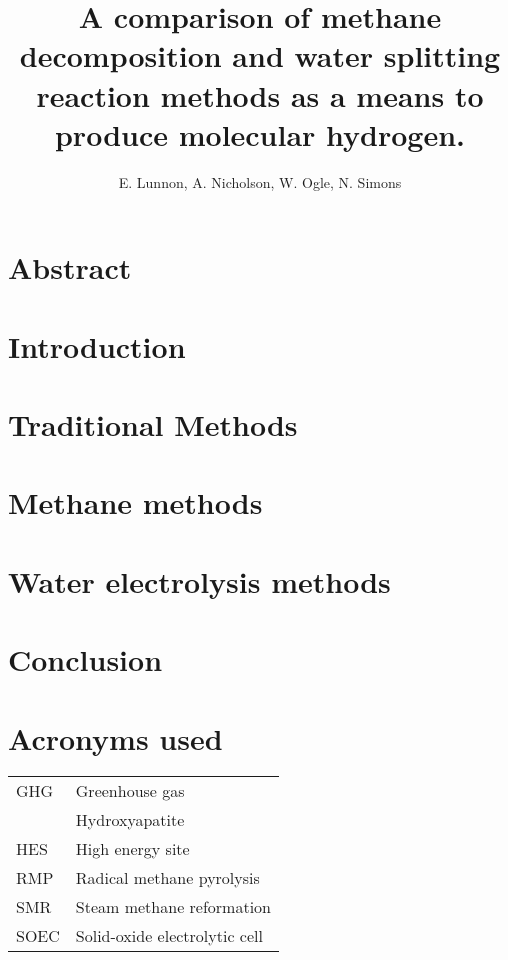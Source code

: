\documentclass[a4paper]{article}
\title{A comparison of methane decomposition and water splitting reaction methods as a means to produce molecular hydrogen.}
\author{E. Lunnon, A. Nicholson, W. Ogle, N. Simons}
\begin{document}
\maketitle
\tableofcontents
\clearpage

\section*{Abstract}%
\label{sec:abstract}



\begin{multicols}{2}
\section{Introduction}%
\label{sec:introduction}


\section{Traditional Methods}%
\label{sub:Traditional_Methods}


\section{Methane methods}%
\label{sub:ch4_methods}


\section{Water electrolysis methods}%
\label{sub:h2o_methods}


\section{Conclusion}%
\label{sec:conclusion}


\section{Acronyms used}%
\label{sec:acronyms_used}

\begin{table}[H]
	\centering
	\begin{tabular}{l l}
		GHG & Greenhouse gas\\
		\ce{HAp} & Hydroxyapatite\\
		HES & High energy site\\
		RMP & Radical methane pyrolysis\\
		SMR & Steam methane reformation\\
		SOEC & Solid-oxide electrolytic cell
	\end{tabular}
\end{table}
%



\end{multicols}
\end{document}
